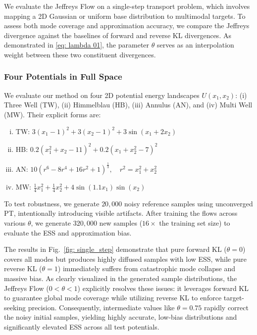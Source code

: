 \documentclass[%
 reprint,
 amsmath,amssymb,
 aps,
 pre,
]{revtex4-2}
\newcommand{\setzero}{\setlength{\itemsep}{0pt}}
\begin{document}
We evaluate the Jeffreys Flow on a single-step transport problem, which involves mapping a 2D Gaussian or uniform base distribution to multimodal targets. To assess both mode coverage and approximation accuracy, we compare the Jeffreys divergence against the baselines of  forward and reverse KL divergences. As demonstrated in \eqref{eq: lambda 01}, the parameter $\theta$ serves as an interpolation weight between these two constituent divergences.

\subsubsection*{Four Potentials in Full Space}

We evaluate our method on four 2D potential energy landscapes $U(x_1, x_2)$: (i) Three Well (TW), (ii) Himmelblau (HB), (iii) Annulus (AN), and (iv) Multi Well (MW). Their explicit forms are:
\begin{enumerate}[(i)]
	\setzero
	\item TW: $3(x_1-1)^2 + 3(x_2-1)^2 + 3\sin(x_1+2x_2)$ 
	\item HB: $0.2(x_1^2 + x_2 - 11)^2 + 0.2(x_1 + x_2^2 - 7)^2$
	\item AN: $10(r^6 - 8r^4 + 16r^2 + 1)^{\frac13}, \quad r^2=x_1^2+x_2^2$ 
	\item MW: $\frac{1}{4}x_1^2 + \frac{1}{4} x_2^2 + 4 \sin(1.1x_1) \sin(x_2)$ 
\end{enumerate}

To test robustness, we generate $20,000$ noisy reference samples using unconverged PT, intentionally introducing visible artifacts. After training the flows across various $\theta$, we generate $320,000$ new samples ($16\times$ the training set size) to evaluate the ESS and approximation bias.

The results in Fig.~\ref{fig: single_step} demonstrate that pure forward KL ($\theta=0$) covers all modes but produces highly diffused samples with low ESS, while pure reverse KL ($\theta=1$) immediately suffers from catastrophic mode collapse and massive bias. As clearly visualized in the generated sample distributions, the Jeffreys Flow ($0 < \theta < 1$) explicitly resolves these issues: it leverages forward KL to guarantee global mode coverage while utilizing reverse KL to enforce target-seeking precision. Consequently, intermediate values like $\theta=0.75$ rapidly correct the noisy initial samples, yielding highly accurate, low-bias distributions and significantly elevated ESS across all test potentials.
\end{document}
